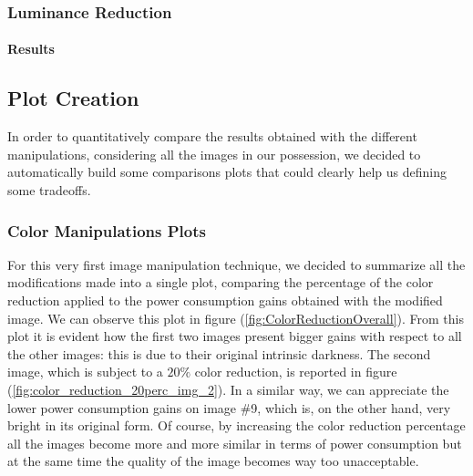 \documentclass[a4paper]{article}
\begin{document}
        \subsubsection{Luminance Reduction}
            \paragraph{Results}

    \subsection{Plot Creation}
        In order to quantitatively compare the results obtained with the different manipulations, considering all the images in our possession, we decided to automatically build some comparisons plots that could clearly help us defining some tradeoffs.
        \subsubsection{Color Manipulations Plots}
            For this very first image manipulation technique, we decided to summarize all the modifications made into a single plot, comparing the percentage of the color reduction applied to the power consumption gains obtained with the modified image.
            We can observe this plot in figure (\ref{fig:ColorReductionOverall}). From this plot it is evident how the first two images present bigger gains with respect to all the other images: this is due to their original intrinsic darkness. The second image, which is subject to a $20\%$ color reduction, is reported in figure (\ref{fig:color_reduction_20perc_img_2}). In a similar way, we can appreciate the lower power consumption gains on image \#9, which is, on the other hand, very bright in its original form. Of course, by increasing the color reduction percentage all the images become more and more similar in terms of power consumption but at the same time the quality of the image becomes way too unacceptable.
\end{document}
